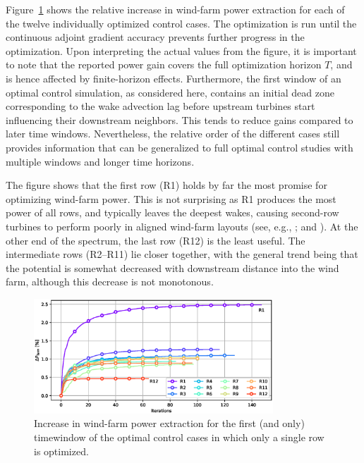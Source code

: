 \documentclass[wes, manuscript]{copernicus}
\begin{document}
Figure~\ref{fig:single_row_opt} shows the relative increase in wind-farm power extraction for each of the twelve individually optimized control cases. The optimization is run until the continuous adjoint gradient accuracy prevents further progress in the optimization. Upon interpreting the actual values from the figure, it is important to note that the reported power gain covers the full optimization horizon $T$, and is hence affected by finite-horizon effects. Furthermore, the first window of an optimal control simulation, as considered here, contains an initial dead zone corresponding to the wake advection lag before upstream turbines start influencing their downstream neighbors. This tends to reduce gains compared to later time windows. Nevertheless, the relative order of the different cases still provides information that can be generalized to full optimal control studies with multiple windows and longer time horizons. 

The figure shows that the first row (R1) holds by far the most promise for optimizing wind-farm power. This is not surprising as R1 produces the most power of all rows, and typically leaves the deepest wakes, causing second-row turbines to perform  poorly in aligned wind-farm layouts (see, e.g., \citealp{porte2013numerical,nilsson2015large}; and \citealp{stevens2016effects}). At the other end of the spectrum, the last row (R12) is the least useful. The intermediate rows (R2--R11) lie closer together, with the general trend being that the potential is somewhat decreased with downstream distance into the wind farm, although this decrease is not monotonous. 

\begin{figure}
	\centering
	\includegraphics[width=0.8\textwidth]{single_row_opt.eps}
	\caption{Increase in wind-farm power extraction for the first (and only) timewindow of the optimal control cases in which only a single row is optimized. \label{fig:single_row_opt}}
\end{figure}
\end{document}
